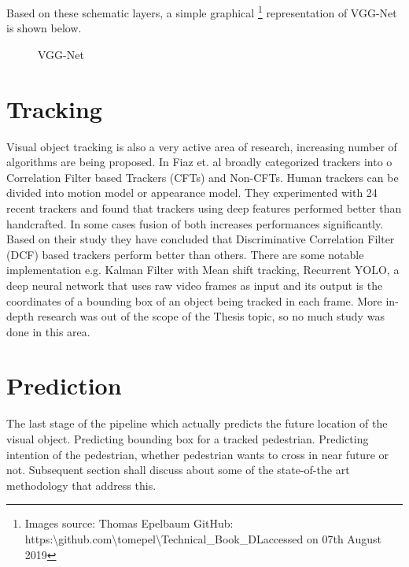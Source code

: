\newpara Based on these schematic layers, a simple graphical \footnote{\label{tomepel} Images source: Thomas Epelbaum GitHub: https:\textbackslash github.com\textbackslash tomepel\textbackslash Technical\_Book\_DLaccessed on 07th August 2019 } representation of VGG-Net is shown below.
\begin{figure}[H]
\begin{center}
\caption{VGG-Net}
\end{center}
\end{figure} 

\section{Tracking}
Visual object tracking is also a very active area of research, increasing number of algorithms are being proposed.
In \cite{fiaz2019handcrafted} Fiaz et. al broadly categorized trackers into o Correlation Filter based Trackers (CFTs) and Non-CFTs. Human trackers can be divided into motion model or appearance model. They experimented with 24 recent trackers and found that trackers using deep features performed better than handcrafted. In some cases fusion of both increases performances significantly. Based on their study they have concluded that Discriminative Correlation Filter (DCF) based trackers perform better than others. There are some notable implementation e.g. 
Kalman Filter with Mean shift tracking, Recurrent YOLO, a deep neural network that uses raw video frames as input and its output is the coordinates of a bounding box of an object being tracked in each frame.
More in-depth research was out of the scope of the Thesis topic, so no much study was done in this area.

\section{Prediction}
The last stage of the pipeline which actually predicts the future location of the visual object. Predicting  bounding box for a tracked pedestrian. Predicting intention of the pedestrian, whether pedestrian wants to cross in near future or not. Subsequent section shall discuss about some of the state-of-the art methodology that address this.


